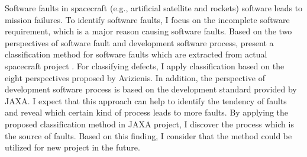 Software faults in spacecraft (e.g., artificial satellite and rockets) software leads to mission failures. 
To identify software faults, I focus on the incomplete software requirement, which is a major reason causing software faults.
Based on the two perspectives of software fault and development software process,  present a classification method for software faults which are extracted from actual spacecraft project . 
For classifying defects, I apply classification based on the eight perspectives proposed by Avizienis.
In addition, the perspective of development software process is based on the development standard provided by JAXA.
I expect that this approach can help to identify the tendency of faults and reveal which certain kind of process leads to more faults.
By applying the proposed classification method in JAXA project, I discover the process which is the source of faults. 
Based on this finding, I consider that the method could be utilized for new project in the future.
